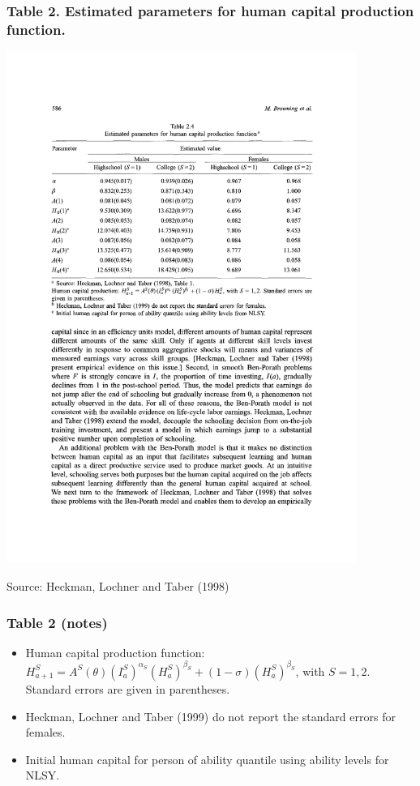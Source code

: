 \documentclass[12pt,compress,handout]{beamer}  %
\begin{document}
\begin{frame}[plain]
\frametitle{Table 2. Estimated parameters for human capital
production function.}
\begin{center}
\includegraphics[width=4.5in]{include/tab-bbh-est-param-hum-cap.pdf}

{\footnotesize Source: Heckman, Lochner and Taber (1998)}
\end{center}
\end{frame}


\begin{frame}
\frametitle{Table 2 (notes)}
\begin{itemize}[<+->]
\item Human capital production function: $H_{a+1}^{S} = A^{S}(\theta)
(I_{a}^{S})^{\alpha_{S}} (H_{a}^{S})^{\beta_{S}} + (1 -\sigma)
(H_{a}^{S})^{\beta_{S}}$, with $S=1,2$. Standard errors are given in
parentheses.

\item Heckman, Lochner and Taber (1999) do not report the standard
errors for females.

\item Initial human capital for person of ability quantile using
ability levels for NLSY.
\end{itemize}
\end{frame}
\end{document}
